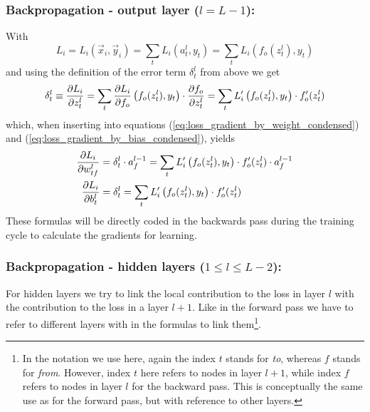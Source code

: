 \subsubsection*{Backpropagation - output layer ($l = L-1$):}

With
\begin{equation}
    L_i = L_i(\vec{x}_i, \vec{y}_i) = \sum\limits_t L_i(a_t^l,y_t)
    = \sum\limits_t L_i \left( f_o(z_t^l),y_t \right)
\end{equation}
and using the definition of the error term $\delta_t^l$ from above we get
\begin{equation}
    \delta_t^l \equiv \frac{\partial {L_i}}{\partial {z_t^l}} = \sum\limits_t \frac{\partial {L_i}}{\partial {f_o}} \left( f_o(z_t^l),y_t \right)
    \cdot \frac{\partial {f_o}}{\partial {z_t^l}}
    = \sum\limits_t L_i^\prime \left( f_o(z_t^l),y_t \right)
    \cdot f_o^\prime(z_t^l)
\end{equation}
which, when inserting into equations (\ref{eq:loss_gradient_by_weight_condensed}) and
(\ref{eq:loss_gradient_by_bias_condensed}), yields
\begin{subequations}
    \begin{align}
        \frac{\partial {L_i}}{\partial {w_{tf}^l}} & = \delta_t^l \cdot a^{l-1}_f =
        \sum\limits_t L_i^\prime \left( f_o(z_t^l),y_t \right)
        \cdot f_o^\prime(z_t^l) \cdot a^{l-1}_f 
        \label{eq:loss_gradient_by_weight_expanded}\\
        \frac{\partial {L_i}}{\partial {b^l_t}} & = \delta_t^l = 
        \sum\limits_t L_i^\prime \left( f_o(z_t^l),y_t \right)
        \cdot f_o^\prime(z_t^l)
        \label{eq:loss_gradient_by_bias_expanded}
    \end{align}
\end{subequations}
These formulas will be directly coded in the backwards pass during the training cycle to
calculate the gradients for learning.

\subsubsection*{Backpropagation - hidden layers ($1 \leq l \leq L-2$):}

For hidden layers we try to link the local contribution to the loss in layer $l$ with the
contribution to the loss in a layer $l+1$. Like in the forward pass we have to refer to
different layers with in the formulas to link them\footnote{In the notation we use here,
again the index $t$ stands for \emph{to}, whereas $f$ stands for \emph{from}. However,
index $t$ here refers to nodes in layer $l+1$, while index $f$ refers to nodes in layer
$l$ for the backward pass. This is conceptually the same use as for the forward pass, but
with reference to other layers.}. \\

